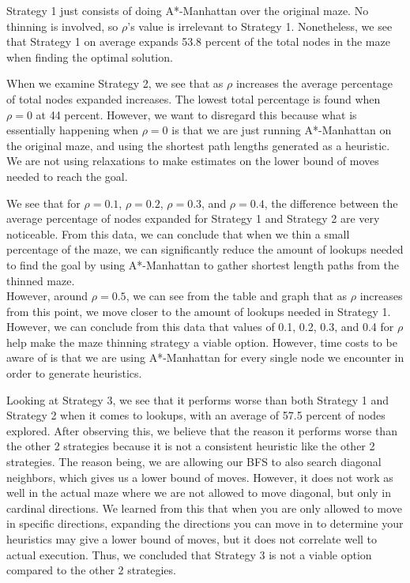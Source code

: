 \documentclass[11pt]{scrartcl} %
\begin{document}
Strategy 1 just consists of doing A*-Manhattan over the original maze. No thinning is involved, so $\rho$'s value is irrelevant to Strategy 1. Nonetheless, we see that Strategy 1 on average expands 53.8 percent of the total nodes in the maze when finding the optimal solution.

\vspace{1em}

When we examine Strategy 2, we see that as $\rho$ increases the average percentage of total nodes expanded increases. The lowest total percentage is found when $\rho = 0$ at 44 percent. However, we want to disregard this because what is essentially happening when $\rho = 0$ is that we are just running A*-Manhattan on the original maze, and using the shortest path lengths generated as a heuristic. We are not using relaxations to make estimates on the lower bound of moves needed to reach the goal.

\vspace{1em}

We see that for $\rho = 0.1$, $\rho = 0.2$, $\rho = 0.3$, and $\rho = 0.4$, the difference between the average percentage of nodes expanded for Strategy 1 and Strategy 2 are very noticeable. From this data, we can conclude that when we thin a small percentage of the maze, we can significantly reduce the amount of lookups needed to find the goal by using A*-Manhattan to gather shortest length paths from the thinned maze.\vspace{2em} \\
However, around $\rho = 0.5$, we can see from the table and graph that as $\rho$ increases from this point, we move closer to the amount of lookups needed in Strategy 1. However, we can conclude from this data that values of 0.1, 0.2, 0.3, and 0.4 for $\rho$ help make the maze thinning strategy a viable option. However, time costs to be aware of is that we are using A*-Manhattan for every single node we encounter in order to generate heuristics.

\vspace{1em}

Looking at Strategy 3, we see that it performs worse than both Strategy 1 and Strategy 2 when it comes to lookups, with an average of 57.5 percent of nodes explored. After observing this, we believe that the reason it performs worse than the other 2 strategies because it is not a consistent heuristic like the other 2 strategies. The reason being, we are allowing our BFS to also search diagonal neighbors, which gives us a lower bound of moves. However, it does not work as well in the actual maze where we are not allowed to move diagonal, but only in cardinal directions. We learned from this that when you are only allowed to move in specific directions, expanding the directions you can move in to determine your heuristics may give a lower bound of moves, but it does not correlate well to actual execution. Thus, we concluded that Strategy 3 is not a viable option compared to the other 2 strategies.
\end{document}
